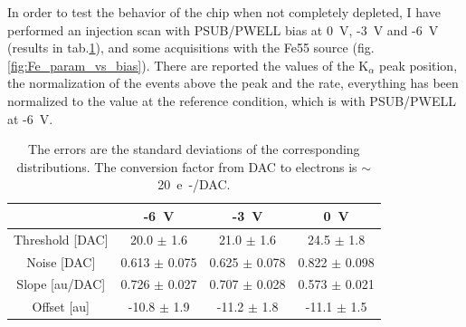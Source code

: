         In order to test the behavior of the chip when not completely depleted, I have performed an injection scan with PSUB/PWELL bias at \SI{0}{V}, -\SI{3}{V} and -\SI{6}{V} (results in tab.\ref{tab:parameters_vs_bias}), and some acquisitions with the Fe55 source (fig. \ref{fig:Fe_param_vs_bias}). There are reported the values of the K$_\alpha$ peak position, the normalization of the events above the peak and the rate, everything has been normalized to the value at the reference condition, which is with PSUB/PWELL at -\SI{6}{V}. 

    \begin{table}
            \begin{center}
            \begin{tabular}{| c |  c | c | c |}
            \hline
               & -\SI{6}{V} & -\SI{3}{V} & \SI{0}{V}\\
            \hline
            \hline
            Threshold [DAC] & 20.0 $\pm$ 1.6 & 21.0 $\pm$ 1.6 & 24.5 $\pm$ 1.8\\
            Noise [DAC] & 0.613 $\pm$ 0.075 & 0.625 $\pm$ 0.078 & 0.822 $\pm$ 0.098\\
            Slope [au/DAC] & 0.726 $\pm$ 0.027 & 0.707 $\pm$ 0.028  & 0.573 $\pm$ 0.021\\
            Offset [au] & -10.8 $\pm$ 1.9 & -11.2 $\pm$ 1.8 & -11.1 $\pm$ 1.5 \\
            \hline
            \end{tabular}
            \caption{The errors are the standard deviations of the corresponding distributions. The conversion factor from DAC to electrons is $\sim$\SI{20}{e-/DAC}.}
            \label{tab:parameters_vs_bias}
            \end{center}
        \end{table}  
        
